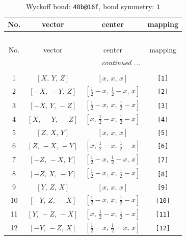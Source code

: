 \documentclass[fleqn,8pt]{jsarticle}
\begin{document}
\begin{longtable}{cccc}
\caption{Wyckoff bond: {\tt 48b@16f}, bond symmetry: {\tt 1}}
 \\
 \hline \hline
No. & vector & center & mapping \\ \hline \endfirsthead

\multicolumn{3}{l}{\tablename\ \thetable{}} \\
 \hline \hline
No. & vector & center & mapping \\ \hline \endhead

 \hline \hline
\multicolumn{3}{r}{\footnotesize\it continued ...} \\ \endfoot

 \hline \hline
\multicolumn{3}{r}{} \\ \endlastfoot

1 & $\left[ X,\, Y,\, Z \right]$ & $\left[ x,\, x,\, x \right]$ & {\tt [1]} \\ \hline
2 & $\left[ - X,\, - Y,\, Z \right]$ & $\left[ \frac{1}{2} - x,\, \frac{1}{2} - x,\, x \right]$ & {\tt [2]} \\ \hline
3 & $\left[ - X,\, Y,\, - Z \right]$ & $\left[ \frac{1}{2} - x,\, x,\, \frac{1}{2} - x \right]$ & {\tt [3]} \\ \hline
4 & $\left[ X,\, - Y,\, - Z \right]$ & $\left[ x,\, \frac{1}{2} - x,\, \frac{1}{2} - x \right]$ & {\tt [4]} \\ \hline
5 & $\left[ Z,\, X,\, Y \right]$ & $\left[ x,\, x,\, x \right]$ & {\tt [5]} \\ \hline
6 & $\left[ Z,\, - X,\, - Y \right]$ & $\left[ x,\, \frac{1}{2} - x,\, \frac{1}{2} - x \right]$ & {\tt [6]} \\ \hline
7 & $\left[ - Z,\, - X,\, Y \right]$ & $\left[ \frac{1}{2} - x,\, \frac{1}{2} - x,\, x \right]$ & {\tt [7]} \\ \hline
8 & $\left[ - Z,\, X,\, - Y \right]$ & $\left[ \frac{1}{2} - x,\, x,\, \frac{1}{2} - x \right]$ & {\tt [8]} \\ \hline
9 & $\left[ Y,\, Z,\, X \right]$ & $\left[ x,\, x,\, x \right]$ & {\tt [9]} \\ \hline
10 & $\left[ - Y,\, Z,\, - X \right]$ & $\left[ \frac{1}{2} - x,\, x,\, \frac{1}{2} - x \right]$ & {\tt [10]} \\ \hline
11 & $\left[ Y,\, - Z,\, - X \right]$ & $\left[ x,\, \frac{1}{2} - x,\, \frac{1}{2} - x \right]$ & {\tt [11]} \\ \hline
12 & $\left[ - Y,\, - Z,\, X \right]$ & $\left[ \frac{1}{2} - x,\, \frac{1}{2} - x,\, x \right]$ & {\tt [12]} \\ \hline

\end{longtable}
\end{document}
